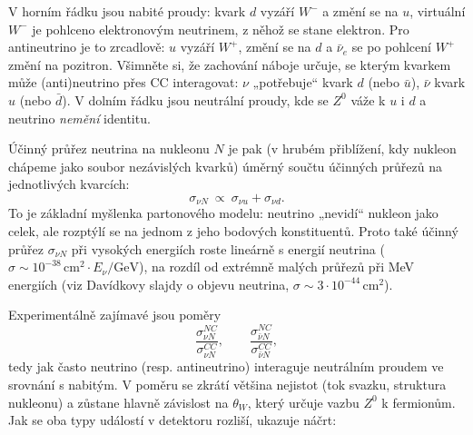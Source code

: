 V horním řádku jsou nabité proudy: kvark \(d\) vyzáří \(W^-\) a změní se na \(u\), virtuální \(W^-\) je pohlceno elektronovým neutrinem, z něhož se stane elektron. Pro antineutrino je to zrcadlově: \(u\) vyzáří \(W^+\), změní se na \(d\) a \(\bar\nu_e\) se po pohlcení \(W^+\) změní na pozitron. Všimněte si, že zachování náboje určuje, se kterým kvarkem může (anti)neutrino přes CC interagovat: \(\nu\) „potřebuje“ kvark \(d\) (nebo \(\bar u\)), \(\bar\nu\) kvark \(u\) (nebo \(\bar d\)). V dolním řádku jsou neutrální proudy, kde se \(Z^0\) váže k \(u\) i \(d\) a neutrino \emph{nemění} identitu.

Účinný průřez neutrina na nukleonu \(N\) je pak (v hrubém přiblížení, kdy nukleon chápeme jako soubor nezávislých kvarků) úměrný součtu účinných průřezů na jednotlivých kvarcích:
\begin{equation}
  \sigma_{\nu N}\ \propto\ \sigma_{\nu u}+\sigma_{\nu d}.
\end{equation}
To je základní myšlenka partonového modelu: neutrino „nevidí“ nukleon jako celek, ale rozptýlí se na jednom z jeho bodových konstituentů. Proto také účinný průřez \(\sigma_{\nu N}\) při vysokých energiích roste lineárně s energií neutrina (\(\sigma\sim 10^{-38}\,\mathrm{cm^2}\cdot E_\nu/\mathrm{GeV}\)), na rozdíl od extrémně malých průřezů při MeV energiích (viz Davídkovy slajdy o objevu neutrina, \(\sigma\sim3\cdot10^{-44}\,\mathrm{cm^2}\)).

Experimentálně zajímavé jsou poměry
\begin{equation}
  \frac{\sigma^{NC}_{\nu N}}{\sigma^{CC}_{\nu N}}, \qquad \frac{\sigma^{NC}_{\bar\nu N}}{\sigma^{CC}_{\bar\nu N}},
\end{equation}
tedy jak často neutrino (resp. antineutrino) interaguje neutrálním proudem ve srovnání s nabitým. V poměru se zkrátí většina nejistot (tok svazku, struktura nukleonu) a zůstane hlavně závislost na  \(\theta_W\), který určuje vazbu \(Z^0\) k fermionům. Jak se oba typy událostí v detektoru rozliší, ukazuje náčrt:

\begin{center}
\end{center}


